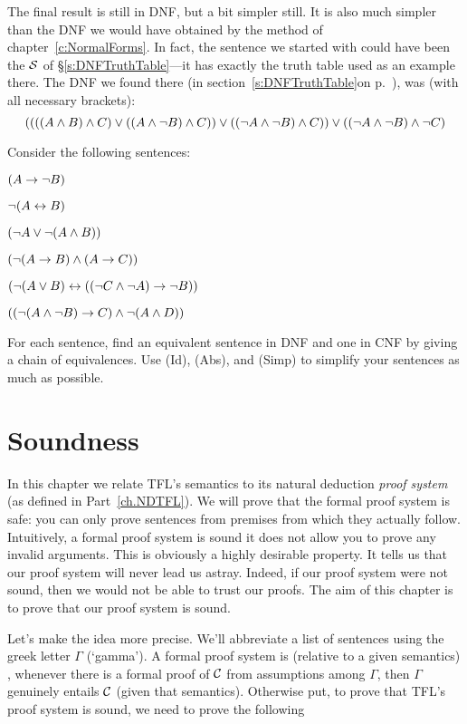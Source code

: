 The final result is still in DNF, but a bit simpler still.  It is also much simpler than the DNF we would have obtained by the method of chapter~\ref{c:NormalForms}. In fact, the sentence we started with could have been the $\mathcal{S}$ of \S\ref{s:DNFTruthTable}---it has exactly the truth table used as an example there. The DNF we found there (\ifHTMLtarget in section~\ref{s:DNFTruthTable}\else on p.~\pageref{longDNF}\fi), was (with all necessary brackets):
$$((((A \wedge B) \wedge C) \vee ((A \wedge \neg B) \wedge C)) \vee ((\neg A \wedge \neg B) \wedge C)) \vee ((\neg A \wedge \neg B) \wedge \neg C)$$

\practiceproblems
\problempart
\label{pr.DNF2}
Consider the following sentences:
\begin{compactlist}
	\item $(A \rightarrow \neg B)$
	\item $\neg (A \leftrightarrow B)$
	\item $(\neg A \vee \neg (A \wedge B))$
	\item $(\neg (A \rightarrow B ) \wedge (A \rightarrow C))$
	\item $(\neg (A \vee B) \leftrightarrow ((\neg C \wedge \neg A) \rightarrow \neg B))$
	\item $((\neg (A \wedge \neg B) \rightarrow C) \wedge \neg (A \wedge D))$
\end{compactlist}
For each sentence, find an equivalent sentence in DNF and one in CNF by giving a chain of equivalences. Use (Id), (Abs), and (Simp) to simplify your sentences as much as possible.

\chapter{Soundness}\label{ch:Soundness}

In this chapter we relate TFL's semantics to its natural deduction \emph{proof system} (as defined in Part~\ref{ch.NDTFL}). We will prove that the formal proof system is safe: you can only prove sentences from premises from which they actually follow.
Intuitively, a formal proof system is sound \ifeff{} it does not allow you to prove any invalid arguments. This is obviously a highly desirable property. It tells us that our proof system will never lead us astray. Indeed, if our proof system were not sound, then we would not be able to trust our proofs. The aim of this chapter is to prove that our proof system is sound.

Let's make the idea more precise. We'll abbreviate a list of sentences using the greek letter $\Gamma$ (`gamma'). A formal proof system is  (relative to a given semantics) \emph{\ifeff}, whenever there is a formal proof of $\mathcal{C}$ from assumptions among $\Gamma$, then $\Gamma$ genuinely entails $\mathcal{C}$ (given that semantics). Otherwise put, to prove that TFL's proof system is sound, we need to prove the following

